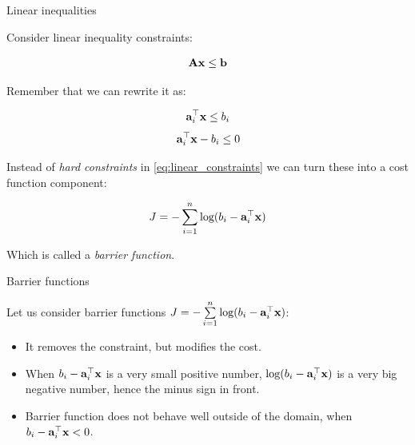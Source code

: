 \documentclass{beamer}
\begin{document}
\begin{frame}{Linear inequalities}
\begin{flushleft}

Consider linear inequality constraints:

\begin{equation}
    \mathbf{A}\mathbf{x} \leq \mathbf{b}
\end{equation}

Remember that we can rewrite it as:

\begin{equation}
    \mathbf{a}_i^\top \mathbf{x} \leq b_i
\end{equation}
\begin{equation}
\label{eq:linear_constraints}
    \mathbf{a}_i^\top \mathbf{x} - b_i \leq 0
\end{equation}

Instead of \emph{hard constraints} in \eqref{eq:linear_constraints} we can turn these into a cost function component:

\begin{equation}
    J = -\sum\limits_{i = 1}^n \text{log} (b_i - \mathbf{a}_i^\top \mathbf{x})
\end{equation}

Which is called a \emph{barrier function}.
 
\end{flushleft}
\end{frame}




\begin{frame}{Barrier functions}
\begin{flushleft}

Let us consider barrier functions $J = -\sum\limits_{i = 1}^n \text{log} (b_i - \mathbf{a}_i^\top \mathbf{x})$:

\begin{itemize}
    \item It removes the constraint, but modifies the cost.
    \item When $b_i - \mathbf{a}_i^\top \mathbf{x}$ is a very small positive number, $\text{log} (b_i - \mathbf{a}_i^\top \mathbf{x})$ is a very big negative number, hence the minus sign in front.
    \item Barrier function does not behave well outside of the domain, when $b_i - \mathbf{a}_i^\top \mathbf{x} < 0$.
\end{itemize}
 
\end{flushleft}
\end{frame}
\end{document}
